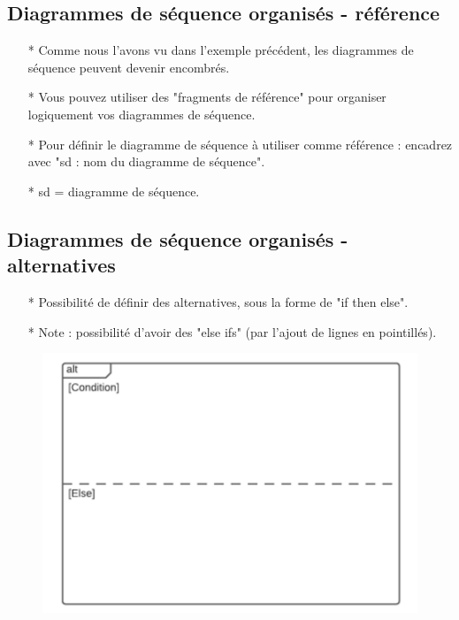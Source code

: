 \documentclass[12pt]{article}
\begin{document}
\subsection{Diagrammes de séquence organisés - référence}
\begin{itemize}
	\item[* ] Comme nous l'avons vu dans l'exemple précédent, les diagrammes de séquence peuvent devenir
	encombrés.
	\item[* ] Vous pouvez utiliser des "fragments de référence" pour organiser logiquement vos diagrammes de séquence.
	\item[* ] Pour définir le diagramme de séquence à utiliser comme référence : encadrez avec "sd : nom
	du diagramme de séquence".
	\item[* ] sd = diagramme de séquence.
\end{itemize}
\subsection{Diagrammes de séquence organisés - alternatives}
\begin{itemize}
	\item[* ] Possibilité de définir des alternatives, sous la forme de "if then else".
	\item[* ] Note : possibilité d'avoir des "else ifs" (par l'ajout de lignes en pointillés).
\end{itemize}
\newpage
	\begin{figure}[!hbtp]
	\centering
	\includegraphics[scale=0.75]{Capture4.PNG}
\end{figure}
\end{document}
